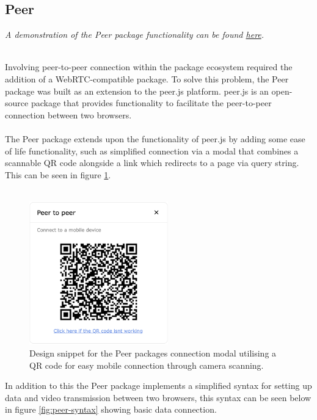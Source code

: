 \documentclass{l4proj}
\begin{document}
\subsection{Peer}
\begin{center}
\textit{A demonstration of the Peer package functionality can be found \href{https://demos-mu.vercel.app/demo/pixl-dinosaur-demo}{here}.}
\end{center}
\\
\text Involving peer-to-peer connection within the package ecosystem required the addition of a WebRTC-compatible package. To solve this problem, the Peer package was built as an extension to the peer.js platform. peer.js is an open-source package that provides functionality to facilitate the peer-to-peer connection between two browsers. 
\\ \\
The Peer package extends upon the functionality of peer.js by adding some ease of life functionality, such as simplified connection via a modal that combines a scannable QR code alongside a link which redirects to a page via query string. This can be seen in figure \ref{fig:qr-scan}. 
\\ \\
\begin{figure}[!ht]
    \centering
    \includegraphics[width=6cm]{dissertation/images/QR-p2p-modal.png}
    \caption{Design snippet for the Peer packages connection modal utilising a QR code for easy mobile connection through camera scanning.}
    \label{fig:qr-scan}
\end{figure}

\text In addition to this the Peer package implements a simplified syntax for setting up data and video transmission between two browsers, this syntax can be seen below in figure \ref{fig:peer-syntax} showing basic data connection.
\end{document}
